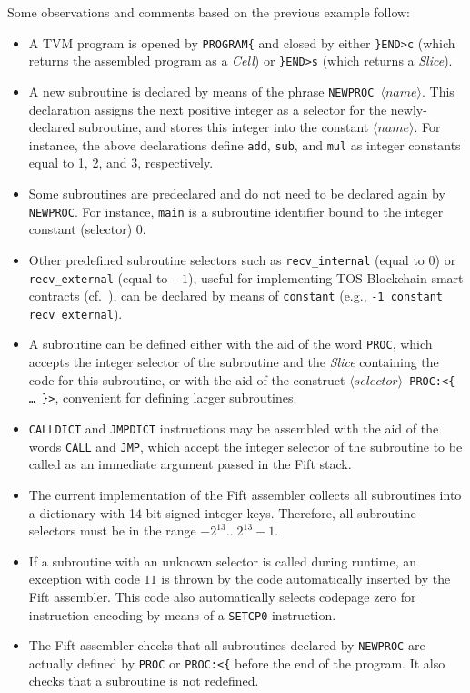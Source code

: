 \documentclass[12pt,oneside]{article}
\begin{document}
Some observations and comments based on the previous example follow:
\begin{itemize}
\item A TVM program is opened by {\tt PROGRAM\{} and closed by either {\tt \}END>c} (which returns the assembled program as a {\em Cell\/}) or {\tt \}END>s} (which returns a {\em Slice\/}).
\item A new subroutine is declared by means of the phrase {\tt NEWPROC $\langle\textit{name}\rangle$}. This declaration assigns the next positive integer as a selector for the newly-declared subroutine, and stores this integer into the constant $\langle\textit{name}\rangle$. For instance, the above declarations define {\tt add}, {\tt sub}, and {\tt mul} as integer constants equal to 1, 2, and 3, respectively.
\item Some subroutines are predeclared and do not need to be declared again by {\tt NEWPROC}. For instance, {\tt main} is a subroutine identifier bound to the integer constant (selector) 0.
\item Other predefined subroutine selectors such as {\tt recv\_internal} (equal to $0$) or {\tt recv\_external} (equal to $-1$), useful for implementing TOS Blockchain smart contracts (cf.~\cite[4.4]{TBC}), can be declared by means of {\tt constant} (e.g., {\tt -1 constant recv\_external}).
\item A subroutine can be defined either with the aid of the word {\tt PROC}, which accepts the integer selector of the subroutine and the {\em Slice} containing the code for this subroutine, or with the aid of the construct {\tt $\langle\textit{selector}\rangle$ PROC:<\{ \dots\ \}>}, convenient for defining larger subroutines.
\item {\tt CALLDICT} and {\tt JMPDICT} instructions may be assembled with the aid of the words {\tt CALL} and {\tt JMP}, which accept the integer selector of the subroutine to be called as an immediate argument passed in the Fift stack.
\item The current implementation of the Fift assembler collects all subroutines into a dictionary with 14-bit signed integer keys. Therefore, all subroutine selectors must be in the range $-2^{13}\dots 2^{13}-1$.
\item If a subroutine with an unknown selector is called during runtime, an exception with code $11$ is thrown by the code automatically inserted by the Fift assembler. This code also automatically selects codepage zero for instruction encoding by means of a {\tt SETCP0} instruction.
\item The Fift assembler checks that all subroutines declared by {\tt NEWPROC} are actually defined by {\tt PROC} or {\tt PROC:<\{} before the end of the program. It also checks that a subroutine is not redefined.
\end{itemize}
\end{document}
